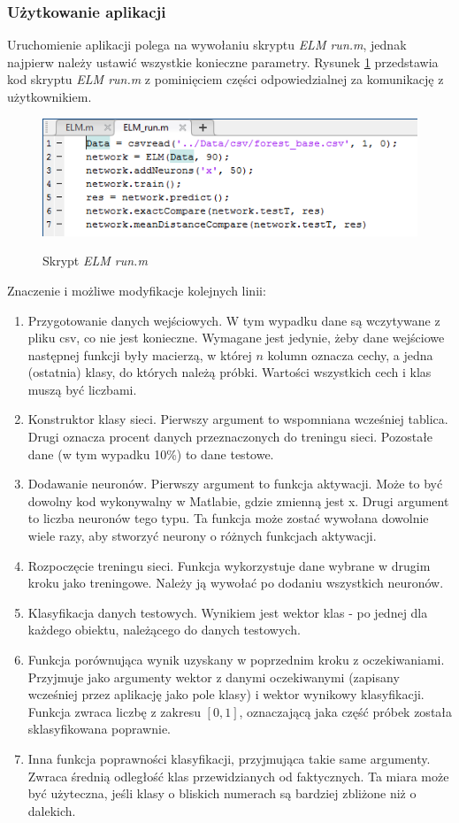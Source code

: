 \documentclass{article}
\begin{document}
\subsubsection*{Użytkowanie aplikacji}
Uruchomienie aplikacji polega na wywołaniu skryptu \textit{ELM \textunderscore run.m}, jednak najpierw należy ustawić wszystkie konieczne parametry. Rysunek \ref{elm_run} przedstawia kod skryptu \textit{ELM \textunderscore run.m} z pominięciem części odpowiedzialnej za komunikację z użytkownikiem.
\begin{figure}[H]
\centering
\includegraphics[width=1\textwidth]{elm_run.png}
\label{elm_run}
\caption{Skrypt \textit{ELM \textunderscore run.m}}
\end{figure}
Znaczenie i możliwe modyfikacje kolejnych linii:
\begin{enumerate}
\item Przygotowanie danych wejściowych.
W tym wypadku dane są wczytywane z pliku csv, co nie jest konieczne.
Wymagane jest jedynie, żeby dane wejściowe następnej funkcji były macierzą, w której $n$ kolumn oznacza cechy, a jedna (ostatnia) klasy, do których należą próbki. Wartości wszystkich cech i klas muszą być liczbami.
\item Konstruktor klasy sieci. 
Pierwszy argument to wspomniana wcześniej tablica. 
Drugi oznacza procent danych przeznaczonych do treningu sieci.
Pozostałe dane (w tym wypadku 10\%) to dane testowe.
\item Dodawanie neuronów.
Pierwszy argument to funkcja aktywacji.
Może to być dowolny kod wykonywalny w Matlabie, gdzie zmienną jest x.
Drugi argument to liczba neuronów tego typu.
Ta funkcja może zostać wywołana dowolnie wiele razy, aby stworzyć neurony o różnych funkcjach aktywacji.
\item Rozpoczęcie treningu sieci. 
Funkcja wykorzystuje dane wybrane w drugim kroku jako treningowe.
Należy ją wywołać po dodaniu wszystkich neuronów.
\item Klasyfikacja danych testowych.
Wynikiem jest wektor klas - po jednej dla każdego obiektu, należącego do danych testowych.
\item Funkcja porównująca wynik uzyskany w poprzednim kroku z oczekiwaniami.
Przyjmuje jako argumenty wektor z danymi oczekiwanymi (zapisany wcześniej przez aplikację jako pole klasy) i wektor wynikowy klasyfikacji.
Funkcja zwraca liczbę z zakresu $[0, 1]$, oznaczającą jaka część próbek została sklasyfikowana poprawnie.
\item Inna funkcja poprawności klasyfikacji, przyjmująca takie same argumenty.
Zwraca średnią odległość klas przewidzianych od faktycznych.
Ta miara może być użyteczna, jeśli klasy o bliskich numerach są bardziej zbliżone niż o dalekich.
\end{enumerate}
\end{document}
